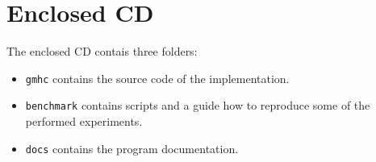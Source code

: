 \documentclass[12pt,a4paper,twoside,openright]{report}
\let\openright=\cleardoublepage
\begin{document}
\chapter{Enclosed CD}

The enclosed CD contais three folders:

\begin{itemize}
	\item \texttt{gmhc} contains the source code of the implementation.
	\item \texttt{benchmark} contains scripts and a guide how to reproduce some of the performed experiments.
	\item \texttt{docs} contains the program documentation.
\end{itemize} 


\openright
\end{document}
